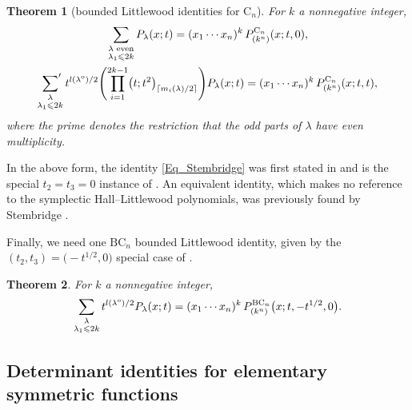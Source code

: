 \documentclass[pdftex]{sigma}
\numberwithin{equation}{section}
\newtheorem{Theorem}{Theorem}[section]
\renewcommand{\leq}{\leqslant}
\newcommand{\ceil}[1]{\lceil#1\rceil}
\newcommand{\la}{\lambda}
\begin{document}
\begin{Theorem}[bounded Littlewood identities for $\mathrm{C}_n$]
For $k$ a nonnegative integer,
\begin{subequations}
\begin{gather}\label{Eq_Stembridge}
\sum_{\substack{\la\textup{ even} \\[1pt] \la_1\leq 2k}}
P_{\la}(x;t)=(x_1\cdots x_n)^k \, P_{(k^n)}^{\mathrm{C}_n}(x;t,0), \\
\label{Eq_Stembridge2}
\sideset{}{'}\sum_{\substack{\la \\[1pt] \la_1\leq 2k}}
t^{l(\la^{\textup{o}})/2}
\Biggl(\prod_{i=1}^{2k-1}\bigl(t;t^2\bigr)_{\ceil{m_i(\la)/2}}\Biggr)
P_{\la}(x;t)=(x_1\cdots x_n)^k \, P_{(k^n)}^{\mathrm{C}_n}(x;t,t),
\end{gather}
\end{subequations}
where the prime denotes the restriction that the odd parts of
$\la$ have even multiplicity.
\end{Theorem}

In the above form, the identity \eqref{Eq_Stembridge} was first stated in
\cite[equation~(4.1.7)]{RW21} and is the special ${t_2=t_3=0}$ instance
of \cite[Theorem~4.7]{RW21}.
An equivalent identity, which makes no reference to the symplectic
Hall--Littlewood polynomials, was previously found by Stembridge
\cite[Theorem~1.2]{Stembridge90}.

Finally, we need one $\mathrm{BC}_n$ bounded Littlewood identity,
given by the $(t_2,t_3)=\bigl(-t^{1/2},0\bigr)$ special case of
\cite[equation~(4.1.15)]{RW21}.

\begin{Theorem}%
For $k$ a nonnegative integer,
\begin{equation}\label{Eq_RW3}
\sum_{\substack{\la \\[1pt] \la_1\leq 2k}}
t^{l(\la^{\textup{o}})/2}
P_{\la}(x;t)=(x_1\cdots x_n)^k\,
P_{(k^n)}^{\mathrm{BC}_n}\bigl(x;t,-t^{1/2},0\bigr).
\end{equation}
\end{Theorem}


\subsection{Determinant identities for elementary symmetric functions}
\end{document}
